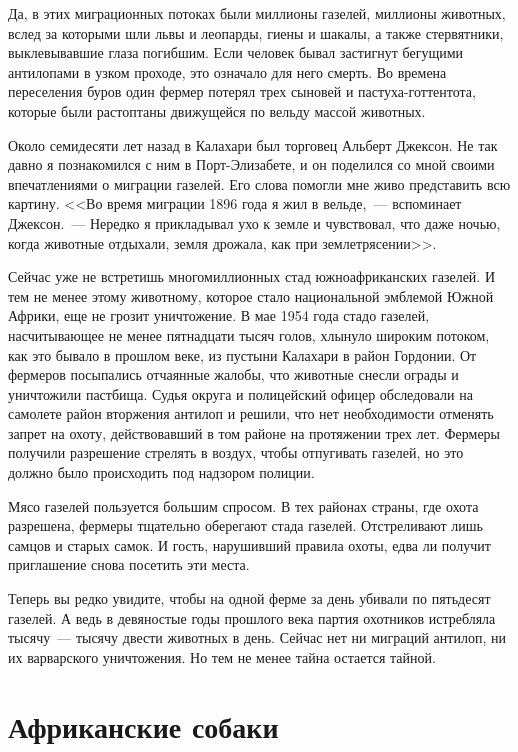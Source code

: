 \documentclass[12pt,a4paper,twoside,openany,svgnames]{memoir}
\begin{document}
Да, в этих миграционных потоках были миллионы газелей, миллионы животных, вслед за которыми шли львы и леопарды, гиены и шакалы, а также стервятники, выклевывавшие глаза погибшим. Если человек бывал застигнут бегущими антилопами в узком проходе, это означало для него смерть. Во времена переселения буров один фермер потерял трех сыновей и пастуха-готтентота, которые были растоптаны движущейся по вельду массой животных.

Около семидесяти лет назад в Калахари был торговец Альберт Джексон. Не так давно я познакомился с ним в Порт-Элизабете, и он поделился со мной своими впечатлениями о миграции газелей. Его слова помогли мне живо представить всю картину. <<Во время миграции 1896 года я жил в вельде,~--- вспоминает Джексон.~--- Нередко я прикладывал ухо к земле и чувствовал, что даже ночью, когда животные отдыхали, земля дрожала, как при землетрясении>>.

Сейчас уже не встретишь многомиллионных стад южноафриканских газелей. И тем не менее этому животному, которое стало национальной эмблемой Южной Африки, еще не грозит уничтожение. В мае 1954 года стадо газелей, насчитывающее не менее пятнадцати тысяч голов, хлынуло широким потоком, как это бывало в прошлом веке, из пустыни Калахари в район Гордонии. От фермеров посыпались отчаянные жалобы, что животные снесли ограды и уничтожили пастбища. Судья округа и полицейский офицер обследовали на самолете район вторжения антилоп и решили, что нет необходимости отменять запрет на охоту, действовавший в том районе на протяжении трех лет. Фермеры получили разрешение стрелять в воздух, чтобы отпугивать газелей, но это должно было происходить под надзором полиции.

Мясо газелей пользуется большим спросом. В тех районах страны, где охота разрешена, фермеры тщательно оберегают стада газелей. Отстреливают лишь самцов и старых самок. И гость, нарушивший правила охоты, едва ли получит приглашение снова посетить эти места.

Теперь вы редко увидите, чтобы на одной ферме за день убивали по пятьдесят газелей. А ведь в девяностые годы прошлого века партия охотников истребляла тысячу~--- тысячу двести животных в день. Сейчас нет ни миграций антилоп, ни их варварского уничтожения. Но тем не менее тайна остается тайной.

\chapter{Африканские собаки}
\end{document}
